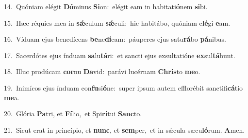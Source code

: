 {\numbfont\textcolor{\numbcolor}{14.}}~Quóniam elégit \textbf{Dó}\-minus \textbf{Si}\-on:~\star elégit eam in habitati\-\textbf{ó}\-nem \textbf{si}\-bi.\par
{\numbfont\textcolor{\numbcolor}{15.}}~Hæc réquies mea in \textbf{sǽ}\-culum \textbf{sǽ}\-culi:~\star hic habitábo, quóniam e\-\textbf{lé}\-gi \textbf{e}\-am.\par
{\numbfont\textcolor{\numbcolor}{16.}}~Víduam ejus benedícens \textbf{be}\-ne\-\textbf{dí}\-cam:~\star páuperes ejus satu\-\textbf{rá}\-bo \textbf{pá}\-nibus.\par
{\numbfont\textcolor{\numbcolor}{17.}}~Sacerdótes ejus índuam \textbf{sa}\-lu\-\textbf{tá}\-ri:~\star et sancti ejus exsultatióne \textbf{ex}\-sul\-\textbf{tá}\-bunt.\par
{\numbfont\textcolor{\numbcolor}{18.}}~Illuc prodúcam \textbf{cor}\-nu \textbf{Da}\-vid:~\star parávi lucérnam \textbf{Chris}\-to \textbf{me}\-o.\par
{\numbfont\textcolor{\numbcolor}{19.}}~Inimícos ejus índuam con\-\textbf{fu}\-si\-\textbf{ó}\-ne:~\star super ipsum autem efflorébit sanctifi\-\textbf{cá}\-tio \textbf{me}\-a.\par
{\numbfont\textcolor{\numbcolor}{20.}}~Glória \textbf{Pa}\-tri, et \textbf{Fí}\-lio,~\star et Spi\-\textbf{rí}\-tui \textbf{Sanc}\-to.\par
{\numbfont\textcolor{\numbcolor}{21.}}~Sicut erat in princípio, et \textbf{nunc}\-, et \textbf{sem}\-per,~\star et in sǽcula sæcu\-\textbf{ló}\-rum. \textbf{A}\-men.\par
